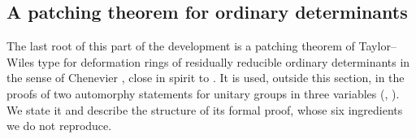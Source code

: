 \subsection{A patching theorem for ordinary determinants}\label{sec:pf:vwin:patch}

The last root of this part of the development is a patching theorem of Taylor--Wiles type
\cite{TaylorWiles1995,Kisin2009,ClozelHarrisTaylor2008} for deformation rings of residually reducible ordinary
determinants in the sense of Chenevier \cite{Chenevier2014}, close in spirit to \cite{Thorne2012}. It is used, outside
this section, in the proofs of two automorphy statements for unitary groups in three variables
(,
). We state it and describe the structure of its
formal proof, whose six ingredients we do not reproduce.

